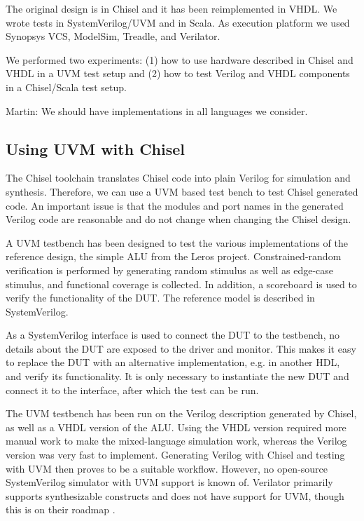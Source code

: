 \documentclass[conference]{IEEEtran}
\newcommand{\martin}[1]{{\color{blue} Martin: #1}}
\begin{document}
The original design is in Chisel and it has been reimplemented in VHDL.
We wrote tests in SystemVerilog/UVM and in Scala.
As execution platform we used Synopsys VCS, ModelSim, Treadle, and Verilator.

We performed two experiments: (1) how to use hardware described in Chisel and VHDL in a
UVM test setup and (2) how to test Verilog and VHDL components in a Chisel/Scala
test setup.

\martin{We should have implementations in all languages we consider.}


\subsection{Using UVM with Chisel}

The Chisel toolchain translates Chisel code into plain Verilog for simulation and synthesis. Therefore, we can use a UVM based test bench to test Chisel generated code.
An important issue is that the modules and port names in the generated Verilog code are reasonable and do not change when changing the Chisel design.

A UVM testbench has been designed to test the various implementations of the reference design, the simple ALU from the Leros project. Constrained-random verification is performed by generating random stimulus as well as edge-case stimulus, and functional coverage is collected. In addition, a scoreboard is used to verify the functionality of the DUT. The reference model is described in SystemVerilog.

As a SystemVerilog interface is used to connect the DUT to the testbench, no details about the DUT are exposed to the driver and monitor. This makes it easy to replace the DUT with an alternative implementation, e.g. in another HDL, and verify its functionality. It is only necessary to instantiate the new DUT and connect it to the interface, after which the test can be run.

The UVM testbench has been run on the Verilog description generated by Chisel, as well as a VHDL version of the ALU. Using the VHDL version required more manual work to make the mixed-language simulation work, whereas the Verilog version was very fast to implement. Generating Verilog with Chisel and testing with UVM then proves to be a suitable workflow. However, no open-source SystemVerilog simulator with UVM support is known of. Verilator primarily supports synthesizable constructs and does not have support for UVM, though this is on their roadmap \cite{Snyder2019}.
\end{document}
